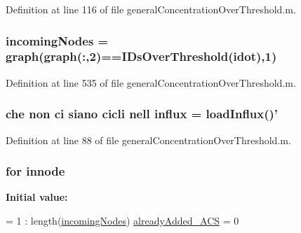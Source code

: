 Definition at line 116 of file general\-Concentration\-Over\-Threshold.\-m.

\hypertarget{a00022_a34c98e3306059653f2a214e5ef975e9c}{
\subsubsection[{incoming\-Nodes}]{\setlength{\rightskip}{0pt plus 5cm}incoming\-Nodes = {\bf graph}({\bf graph}(\-:,2)=={\bf I\-Ds\-Over\-Threshold}(idot),1)}}\label{a00022_a34c98e3306059653f2a214e5ef975e9c}


Definition at line 535 of file general\-Concentration\-Over\-Threshold.\-m.

\hypertarget{a00022_a637d2af7e7b03600bcaf1931b999e3fc}{
\subsubsection[{influx}]{ che non ci siano cicli nell influx = load\-Influx()'}}\label{a00022_a637d2af7e7b03600bcaf1931b999e3fc}


Definition at line 88 of file general\-Concentration\-Over\-Threshold.\-m.

\hypertarget{a00022_a21f06040cb68a910280e04d4c59d980e}{
\subsubsection[{innode}]{\setlength{\rightskip}{0pt plus 5cm}for innode}}\label{a00022_a21f06040cb68a910280e04d4c59d980e}
{\bfseries Initial value\-:}
\begin{DoxyCode}
= 1 : length(\hyperlink{a00022_a34c98e3306059653f2a214e5ef975e9c}{incomingNodes})
                            \hyperlink{a00022_a77c2cda04a3103708011753a77dceda3}{alreadyAdded\_ACS} = 0
\end{DoxyCode}



